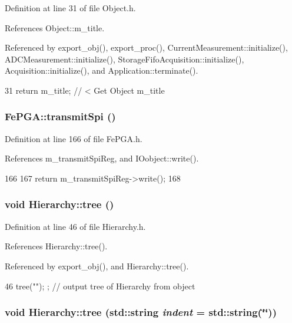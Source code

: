 Definition at line 31 of file Object.h.

References Object::m\_\-title.

Referenced by export\_\-obj(), export\_\-proc(), CurrentMeasurement::initialize(), ADCMeasurement::initialize(), StorageFifoAcquisition::initialize(), Acquisition::initialize(), and Application::terminate().


\begin{DoxyCode}
31 { return m_title;      } // < Get Object m_title
\end{DoxyCode}
\hypertarget{classFePGA_ac7698a9f59f7290a6bb648030976597f}{
\subsubsection[{transmitSpi}]{ FePGA::transmitSpi ()}}
\label{classFePGA_ac7698a9f59f7290a6bb648030976597f}


Definition at line 166 of file FePGA.h.

References m\_\-transmitSpiReg, and IOobject::write().


\begin{DoxyCode}
166                            {
167     return m_transmitSpiReg->write();
168   }
\end{DoxyCode}
\hypertarget{classHierarchy_a594c294c5f60c230e106d522ed008212}{
\subsubsection[{tree}]{\setlength{\rightskip}{0pt plus 5cm}void Hierarchy::tree ()}}
\label{classHierarchy_a594c294c5f60c230e106d522ed008212}


Definition at line 46 of file Hierarchy.h.

References Hierarchy::tree().

Referenced by export\_\-obj(), and Hierarchy::tree().


\begin{DoxyCode}
46 { tree(""); };                     // output tree of Hierarchy from object
\end{DoxyCode}
\hypertarget{classHierarchy_a76e914b9a677a22a82deb74d892bf261}{
\subsubsection[{tree}]{\setlength{\rightskip}{0pt plus 5cm}void Hierarchy::tree (std::string {\em indent} = {\ttfamily std::string(\char`\"{}\char`\"{})})}}
\label{classHierarchy_a76e914b9a677a22a82deb74d892bf261}


